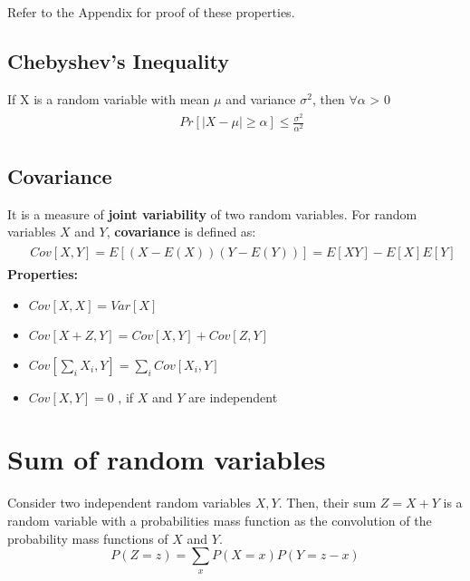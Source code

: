 \documentclass[12pt]{article}
\begin{document}
Refer to the Appendix for proof of these properties.

    \subsection{Chebyshev's Inequality}
    If X is a random variable with mean $\mu$ and variance $\sigma^2$, then $\forall \alpha$ > 0
    \begin{gather} 
        \begin{aligned}
         \quad Pr[|X − \mu| ≥ \alpha] ≤ \frac{\sigma^2}{\alpha^2}
               \label{eqn:nonnegatie}
        \end{aligned}
    \end{gather}

\subsection{Covariance}
    It is a measure of \textbf{joint variability} of two random variables. For random variables $X$ and $Y$, \textbf{covariance} is defined as:
    \begin{gather} 
        \begin{aligned}
         \quad   Cov [X , Y ] = E [(X − E (X ))(Y − E (Y ))] = E [XY ] − E [X ]E [Y ]
               \label{eqn:nonnegatie}
        \end{aligned}
    \end{gather}
     \textbf{Properties:}
    \begin{itemize}
        \item $Cov [X , X ] = Var [X ]$
        \item $Cov [X + Z , Y ] = Cov [X , Y ] + Cov [Z , Y ]$
        \item $Cov [ \sum_i{X_i} , Y ] = \sum_i Cov [X_i , Y ]$
        \item $Cov[X, Y] = 0$ , if $X$ and $Y$ are independent
    \end{itemize}

\section{Sum of random variables}
Consider two independent random variables $X, Y$. Then, their sum $Z = X+Y$ is a random variable with a probabilities mass function as the convolution of the probability mass functions of $X$ and $Y$.
\begin{equation*}
    P(Z=z) = \sum_{x}P(X=x) P(Y=z-x)
\end{equation*}
    
\end{document}
